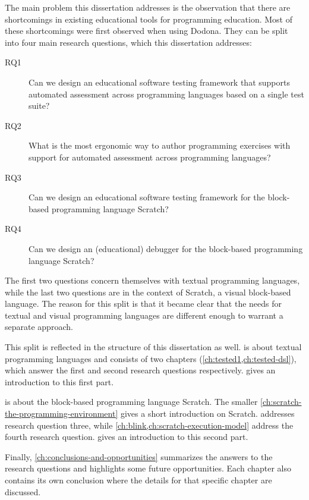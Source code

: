 \documentclass[../main]{subfiles}
\begin{document}
The main problem this dissertation addresses is the observation that there are shortcomings in existing educational tools for programming education.
Most of these shortcomings were first observed when using Dodona.
They can be split into four main research questions, which this dissertation addresses:

\begin{description}
    \item[RQ1] Can we design an educational software testing framework that supports automated assessment across programming languages based on a single test suite?
    \item[RQ2] What is the most ergonomic way to author programming exercises with support for automated assessment across programming languages?
    \item[RQ3] Can we design an educational software testing framework for the block-based programming language Scratch?
    \item[RQ4] Can we design an (educational) debugger for the block-based programming language Scratch?
\end{description}

The first two questions concern themselves with textual programming languages, while the last two questions are in the context of Scratch, a visual block-based language.
The reason for this split is that it became clear that the needs for textual and visual programming languages are different enough to warrant a separate approach.

This split is reflected in the structure of this dissertation as well.
 is about textual programming languages and consists of two chapters (\cref{ch:tested1,ch:tested-dsl}), which answer the first and second research questions respectively.
 gives an introduction to this first part.

 is about the block-based programming language Scratch.
The smaller \cref{ch:scratch-the-programming-environment} gives a short introduction on Scratch.
 addresses research question three, while \cref{ch:blink,ch:scratch-execution-model} address the fourth research question.
 gives an introduction to this second part.

Finally, \cref{ch:conclusions-and-opportunities} summarizes the answers to the research questions and highlights some future opportunities.
Each chapter also contains its own conclusion where the details for that specific chapter are discussed.
\end{document}

